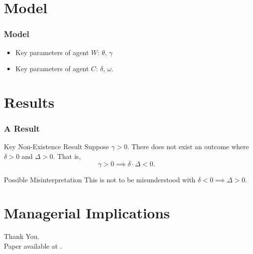\documentclass[9pt, mathserif]{beamer}
\begin{document}
\section{Model}

\begin{frame}
\frametitle{Model}
\begin{itemize}[<+->]\setlength\itemsep{2em}
\item Key parameters of agent $W$: $\theta$, $\gamma$

\item Key parameters of agent $C$: $\delta$, $\omega$.

\end{itemize}


\end{frame}

\section{Results}

\begin{frame}
\frametitle{A Result}
\pause
\begin{block}{Key Non-Existence Result}
Suppose $\gamma > 0$. There does not exist an outcome where $\delta > 0$ and $\Delta > 0$. That is,
\begin{equation*}
\gamma > 0 \implies \delta \cdot \Delta < 0.
\end{equation*}
\end{block}
\pause
\begin{block}{Possible Misinterpretation}
This is not to be misunderstood with $\delta < 0 \implies \Delta > 0$.
\end{block}

\end{frame}

\section[Implications]{Managerial Implications}

\begin{frame}
\begin{center}
\textcolor{asumaroon}{\Huge{Thank You}.}\\ \bigskip
Paper available at \texttt{}.
\end{center}
\end{frame}
\end{document}
